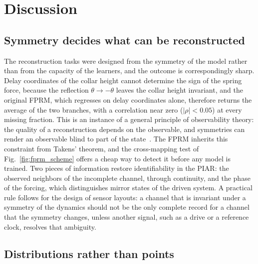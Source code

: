 \section{Discussion}\label{sec:discussion}

\subsection{Symmetry decides what can be reconstructed}

The reconstruction tasks were designed from the symmetry of the model rather than from the capacity of the learners, and the outcome is correspondingly sharp. Delay coordinates of the collar height cannot determine the sign of the spring force, because the reflection $\theta\to-\theta$ leaves the collar height invariant, and the original FPRM, which regresses on delay coordinates alone, therefore returns the average of the two branches, with a correlation near zero ($|\rho|<0.05$) at every missing fraction. This is an instance of a general principle of observability theory: the quality of a reconstruction depends on the observable, and symmetries can render an observable blind to part of the state~\cite{LetellierAguirre2002,Letellier2005}. The FPRM inherits this constraint from Takens' theorem, and the cross-mapping test of Fig.~\ref{fig:fprm_scheme} offers a cheap way to detect it before any model is trained. Two pieces of information restore identifiability in the PIAR: the observed neighbors of the incomplete channel, through continuity, and the phase of the forcing, which distinguishes mirror states of the driven system. A practical rule follows for the design of sensor layouts: a channel that is invariant under a symmetry of the dynamics should not be the only complete record for a channel that the symmetry changes, unless another signal, such as a drive or a reference clock, resolves that ambiguity.

\subsection{Distributions rather than points}

